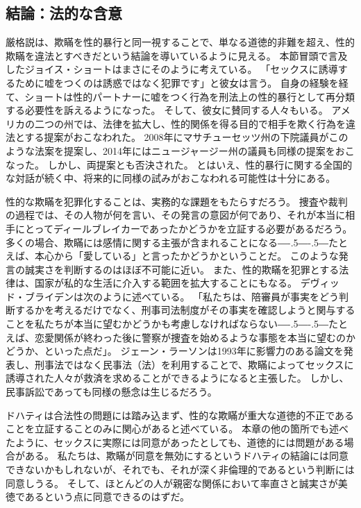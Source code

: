 \documentclass[paper=a4,book,openany]{jlreq}
\def\DDASH{―\kern-.5\zw―\kern-.5\zw―}
\begin{document}
\subsection{結論：法的な含意}

厳格説は、欺瞞を性的暴行と同一視することで、単なる道徳的非難を超え、性的欺瞞を違法とすべきだという結論を導いているように見える。
本節冒頭で言及したジョイス・ショートはまさにそのように考えている。
「セックスに誘導するために嘘をつくのは誘惑ではなく犯罪です」と彼女は言う\citep{mcarthur16:_is_lying_get_laid_form_sexual_assaul}。
自身の経験を経て、ショートは性的パートナーに嘘をつく行為を刑法上の性的暴行として再分類する必要性を訴えるようになった。
そして、彼女に賛同する人々もいる。
アメリカの二つの州では、法律を拡大し、性的関係を得る目的で相手を欺く行為を違法とする提案がおこなわれた。
2008年にマサチューセッツ州の下院議員がこのような法案を提案し、2014年にはニュージャージー州の議員も同様の提案をおこなった。
しかし、両提案とも否決された。
とはいえ、性的暴行に関する全国的な対話が続く中、将来的に同様の試みがおこなわれる可能性は十分にある。

性的な欺瞞を犯罪化することは、実務的な課題をもたらすだろう。
捜査や裁判の過程では、その人物が何を言い、その発言の意図が何であり、それが本当に相手にとってディールブレイカーであったかどうかを立証する必要があるだろう。
多くの場合、欺瞞には感情に関する主張が含まれることになる{\DDASH}たとえば、本心から「愛している」と言ったかどうかということだ。
このような発言の誠実さを判断するのはほぼ不可能に近い。
また、性的欺瞞を犯罪とする法律は、国家が私的な生活に介入する範囲を拡大することにもなる。
デヴィッド・ブライデンは次のように述べている。
「私たちは、陪審員が事実をどう判断するかを考えるだけでなく、刑事司法制度がその事実を確認しようと関与することを私たちが本当に望むかどうかも考慮しなければならない{\DDASH}たとえば、恋愛関係が終わった後に警察が捜査を始めるような事態を本当に望むのかどうか、といった点だ」\citep[p.469]{bryden00:_redef_rape}。
ジェーン・ラーソンは1993年に影響力のある論文を発表し、刑事法ではなく民事法（法）を利用することで、欺瞞によってセックスに誘導された人々が救済を求めることができるようになると主張した\citep{larson93:_women_under_so_littl_they}。
しかし、民事訴訟であっても同様の懸念は生じるだろう。

ドハティは合法性の問題には踏み込まず、性的な欺瞞が重大な道徳的不正であることを立証することのみに関心があると述べている。
本章の他の箇所でも述べたように、セックスに実際には同意があったとしても、道徳的には問題がある場合がある。
私たちは、欺瞞が同意を無効にするというドハティの結論には同意できないかもしれないが、それでも、それが深く非倫理的であるという判断には同意しうる。
そして、ほとんどの人が親密な関係において率直さと誠実さが美徳であるという点に同意できるのはずだ。
\end{document}
